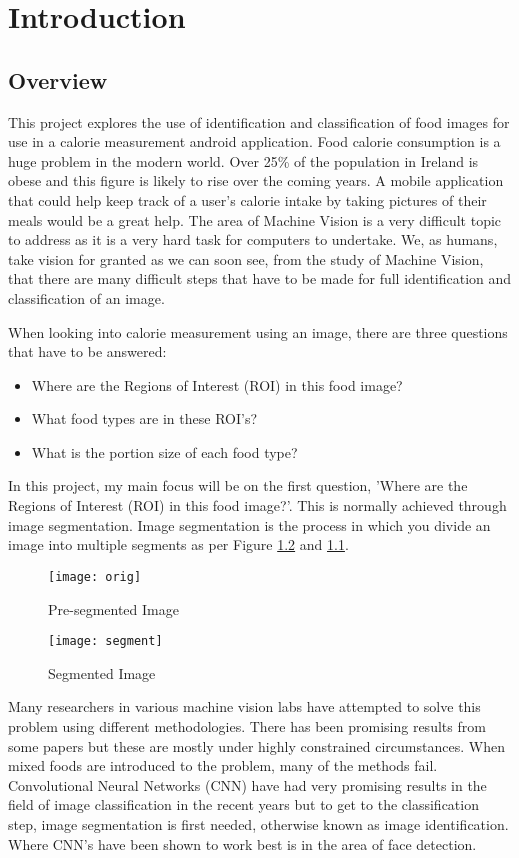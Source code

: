 \chapter{Introduction}
\label{intro}

\section{Overview}
This project explores the use of identification and classification of food images for use in a calorie measurement android application.
Food calorie consumption is a huge problem in the modern world.
Over 25\% of the population in Ireland is obese and this figure is likely to rise over the coming years.
A mobile application that could help keep track of a user's calorie intake by taking pictures of their meals would be a great help.
The area of Machine Vision is a very difficult topic to address as it is a very hard task for computers to undertake.
We, as humans, take vision for granted as we can soon see, from the study of Machine Vision, that there are many difficult steps that have to be made for full identification and classification of an image.

When looking into calorie measurement using an image, there are three questions that have to be answered:
\begin{itemize}
\item{Where are the Regions of Interest (ROI) in this food image?}
\item{What food types are in these ROI's?}
\item{What is the portion size of each food type?}
\end{itemize}
In this project, my main focus will be on the first question, 'Where are the
Regions of Interest (ROI) in this food image?'. This is normally achieved
through image segmentation. Image segmentation is the process in which you
divide an image into multiple segments as per Figure \ref{fig:imageSeg} and \ref{fig:preImageSeg}.

\begin{figure}
	\texttt{[image: orig]}
	\caption{Pre-segmented Image}
	\label{fig:preImageSeg}
\end{figure}

\begin{figure}
	\texttt{[image: segment]}
	\caption{Segmented Image}
	\label{fig:imageSeg}
\end{figure}


Many researchers in various machine vision labs have attempted to solve this
problem using different methodologies.
There has been promising results from some papers but these are mostly under highly constrained circumstances.
When mixed foods are introduced to the problem, many of the methods fail.
Convolutional Neural Networks (CNN) have had very promising results in the field of image classification in the recent years but to get to the classification step, image segmentation is first needed, otherwise known as image identification.
Where CNN's have been shown to work best is in the area of face detection.

